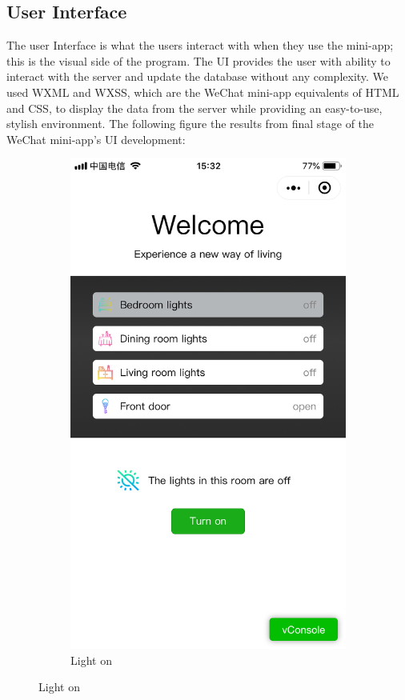 \documentclass[12pt,a4paper]{report}
\begin{document}
\subsection{User Interface}
The user Interface is what the users interact with when they use the mini-app; this is the visual side of the program. The UI provides the user with ability to interact with the server and update the database without any complexity. We used WXML and WXSS, which are the WeChat mini-app equivalents of HTML and CSS, to display the data from the server while providing an easy-to-use, stylish environment. The following figure the results from final stage of the WeChat mini-app's UI development:
\begin{figure}[H]
	\begin{subfigure}{.3\textwidth}
		\centering
		\includegraphics[width=.8\linewidth]{figures/1.png}
		\caption{Light on}
	\end{subfigure}

\end{figure}
\end{document}

